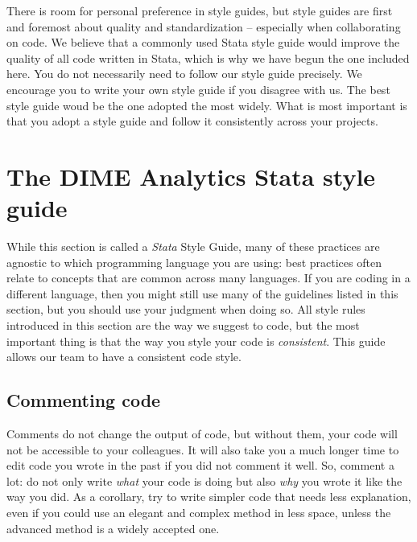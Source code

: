 There is room for personal preference in style guides, but style guides are first and foremost
about quality and standardization -- especially when collaborating on code. We believe that a commonly used Stata style guide
would improve the quality of all code written in Stata, which is why we have begun the one included here. You do not necessarily need to follow our
style guide precisely. We encourage you to write your own style guide if you disagree with us. The best style guide
woud be the one adopted the most widely. What is most important is that you adopt a style guide and follow it consistently across your projects.

\newpage

\section{The DIME Analytics Stata style guide}

While this section is called a \textit{Stata} Style Guide,
many of these practices are agnostic to which programming language you are using:
best practices often relate to concepts that are common across many languages.
If you are coding in a different language,
then you might still use many of the guidelines listed in this section,
but you should use your judgment when doing so.
All style rules introduced in this section are the way we suggest to code,
but the most important thing is that the way you style your code is \textit{consistent}.
This guide allows our team to have a consistent code style.

\subsection{Commenting code}

Comments do not change the output of code, but without them,
your code will not be accessible to your colleagues.
It will also take you a much longer time to edit code you wrote in the past if you did not comment it well.
So, comment a lot: do not only write \textit{what} your code is doing
but also \textit{why} you wrote it like the way you did.
As a corollary, try to write simpler code that needs less explanation,
even if you could use an elegant and complex method in less space,
unless the advanced method is a widely accepted one.

